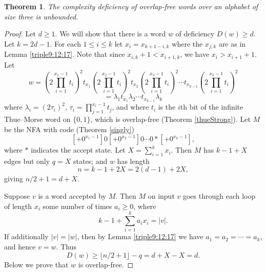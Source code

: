 \documentclass[12pt]{article}
\newcommand{\abs}[1]{\lvert#1\rvert}
\theoremstyle{plain}
\newtheorem{thm}{Theorem}
\theoremstyle{definition}
\theoremstyle{remark}
\begin{document}
			\begin{thm}\label{unbounded}
				The complexity deficiency of overlap-free words over an alphabet of size three is unbounded.
			\end{thm}
			\begin{proof}
				Let $d\ge 1$. We will show that there is a word $w$ of deficiency $D(w)\ge d$. Let $k=2d-1$.
				For each $1\le i\le k$ let $x_i = x_{k+1-i,k}$ where the $x_{j,k}$ are as in Lemma \ref{triple9:12:17}.
				Note that since $x_{i,k}+1<x_{i+1,k}$, we have $x_i>x_{i+1}+1$.
				Let
				\[
					w = {\left(2\prod_{i=1}^{x_1-1} t_i\right)}^2 t_{x_1}
					    {\left(2\prod_{i=1}^{x_2-1} t_i\right)}^2 t_{x_2}
					    {\left(2\prod_{i=1}^{x_3-1} t_i\right)}^2 \cdots t_{x_{k-1}}
					    {\left(2\prod_{i=1}^{x_k-1} t_i\right)}^2
				\]
				\[
					= \lambda_{1} t_{x_1} \lambda_{2} \cdots t_{x_{k-1}} \lambda_{k}
				\]
				where $\lambda_i = {(2\tau_i)}^2$, $\tau_i=\prod_{j=1}^{x_i-1} t_j$, and
				where $t_i$ is the $i$th bit of the infinite Thue--Morse word on $\{0,1\}$, which is overlap-free (Theorem \ref{thueStrong}).
				Let $M$ be the NFA with code (Theorem \ref{singly})
				\[
					[+0^{x_1-1}]0[+0^{x_2-1}]0\cdots 0*[+0^{x_k-1}],
				\]
				where $*$ indicates the accept state. Let $X=\sum_{i=1}^{k}x_i$.
				Then $M$ has $k-1+X$ edges but only $q=X$ states; and $w$ has length
				\[
					n = k-1+2X = 2(d - 1) + 2X,
				\]
				giving $n/2+1=d + X$.
				
				Suppose $v$ is a word accepted by $M$. Then $M$ on input $v$ goes through each
				loop of length $x_i$ some number of times $a_i\ge 0$, where
				\[
					k - 1 + \sum_{i=1}^k a_i x_i = \abs{v}.
				\]
				If additionally $\abs{v}=\abs{w}$, then by Lemma \ref{triple9:12:17} we have $a_1 = a_2 = \cdots = a_k$, and hence $v = w$.
				Thus
				\[
					D(w) \ge \lfloor n/2 + 1\rfloor - q = d+X-X =d.
				\]
				Below we prove that $w$ is overlap-free.
			\end{proof}
\end{document}
